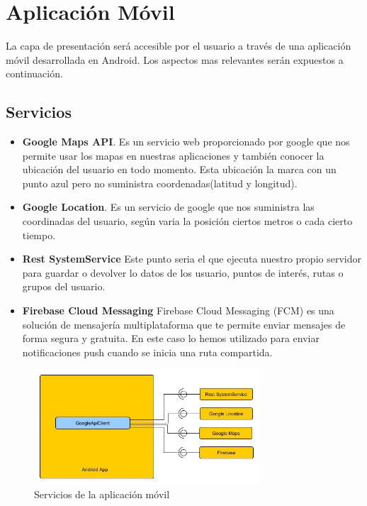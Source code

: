 \section{Aplicación Móvil}
La capa de presentación será accesible por el usuario a través de una aplicación móvil desarrollada en Android. Los aspectos mas relevantes serán expuestos a continuación.

\subsection{Servicios}
\begin{itemize}
\item \textbf{Google Maps API}. Es un servicio web proporcionado por google que nos permite usar los mapas en nuestras aplicaciones y también conocer la ubicación del usuario  en todo momento. Esta ubicación la marca con un punto azul pero no suministra coordenadas(latitud y longitud).
\item \textbf{Google Location}. Es un servicio de google que nos suministra las coordinadas del usuario, según varia la posición ciertos metros o cada cierto tiempo.
\item \textbf{Rest SystemService} Este punto seria el que ejecuta nuestro propio servidor para guardar o devolver lo datos de los usuario, puntos de interés, rutas o grupos del usuario.
\item \textbf{Firebase Cloud Messaging} Firebase Cloud Messaging (FCM) es una solución de mensajería multiplataforma que te permite enviar mensajes de forma segura y gratuita. En este caso lo hemos utilizado para enviar notificaciones push cuando se inicia una ruta compartida.
\end{itemize}
\begin{figure}[H]
		\centering
		\includegraphics[width=0.75\textwidth] {arquitectura-movil.jpg}
		\caption{Servicios de la aplicación móvil }
	\end{figure}
	
	
